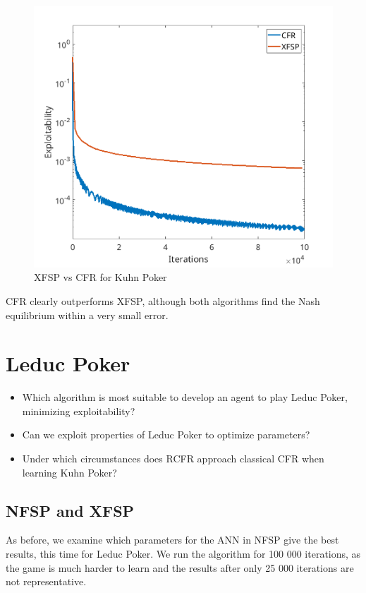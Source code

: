 \documentclass[10pt,a4paper]{article}
\begin{document}
\begin{figure}[h]
\centering
\includegraphics[scale=0.4]{Figures/cfr_vs_xfsp_kuhn.png}
\caption{XFSP vs CFR for Kuhn Poker}
\end{figure}

CFR clearly outperforms XFSP, although both algorithms find the Nash equilibrium within a very small error.



\section{Leduc Poker}
\begin{tcolorbox}
\begin{itemize}
\item{Which algorithm is most suitable to develop an agent to play Leduc Poker, minimizing exploitability?}
\item{Can we exploit properties of Leduc Poker to optimize parameters?}
\item{Under which circumstances does RCFR approach classical CFR when learning Kuhn Poker?}
\end{itemize}
\end{tcolorbox}
\subsection{NFSP and XFSP}
As before, we examine which parameters for the ANN in NFSP give the best results, this time for Leduc Poker. We run the algorithm for 100 000 iterations, as the game is much harder to learn and the results after only 25 000 iterations are not representative.
\end{document}
